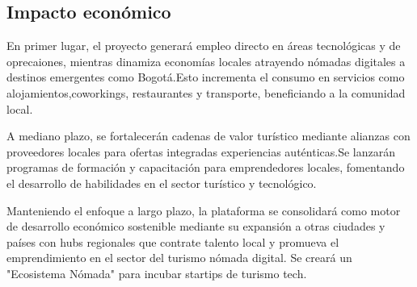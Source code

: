 \subsection{Impacto económico}

En primer lugar, el proyecto generará empleo directo en áreas tecnológicas y de oprecaiones, mientras dinamiza economías locales atrayendo nómadas digitales a destinos emergentes como Bogotá.Esto incrementa el consumo en servicios como alojamientos,coworkings, restaurantes y transporte, beneficiando a la comunidad local.

A mediano plazo, se fortalecerán cadenas de valor turístico mediante alianzas con proveedores locales para ofertas integradas experiencias auténticas.Se lanzarán programas de formación y capacitación para emprendedores locales, fomentando el desarrollo de habilidades en el sector turístico y tecnológico.

Manteniendo el enfoque a largo plazo, la plataforma se consolidará como motor de desarrollo económico sostenible mediante su expansión a otras ciudades y países con hubs regionales que contrate talento local y promueva el emprendimiento en el sector del turismo nómada digital. Se creará un "Ecosistema Nómada" para incubar startips de turismo tech.
